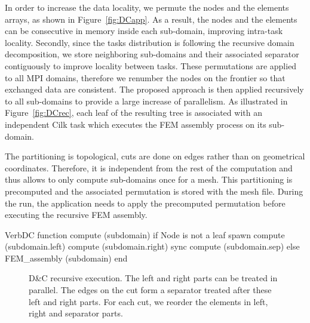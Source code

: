 \documentclass[10pt]{IOS-Book-Article}
\begin{document}
In order to increase the data locality, we permute the nodes and the elements arrays, as shown in Figure~\ref{fig:DCapp}.
As a result, the nodes and the elements can be consecutive in memory inside each sub-domain, improving intra-task locality.
Secondly, since the tasks distribution is following the recursive domain decomposition, we store neighboring sub-domains and their associated separator contiguously to improve locality between tasks.
These permutations are applied to all MPI domains, therefore we renumber the nodes on the frontier so that exchanged data are consistent.
The proposed approach is then applied recursively to all sub-domains to provide a large increase of parallelism.
As illustrated in Figure~\ref{fig:DCrec}, each leaf of the resulting tree is associated with an independent Cilk task which executes the FEM assembly process on its sub-domain.

The partitioning is topological, cuts are done on edges rather than on geometrical coordinates.
Therefore, it is independent from the rest of the computation and thus allows to only compute sub-domains once for a mesh.
This partitioning is precomputed and the associated permutation is stored with the mesh file.
During the run, the application needs to apply the precomputed permutation before executing the recursive FEM assembly.


\begin{SaveVerbatim}[]{VerbDC}
function compute (subdomain) 
  if Node is not a leaf
    spawn compute (subdomain.left)
    compute (subdomain.right)
    sync
    compute (subdomain.sep)
  else
    FEM_assembly (subdomain)
end    
\end{SaveVerbatim}

\begin{figure}[htp]
\caption{D\&C recursive execution. The left and right parts can be treated in parallel.
The edges on the cut form a separator treated after these left and right parts.
For each cut, we reorder the elements in left, right and separator parts.}
\end{figure}
\end{document}

